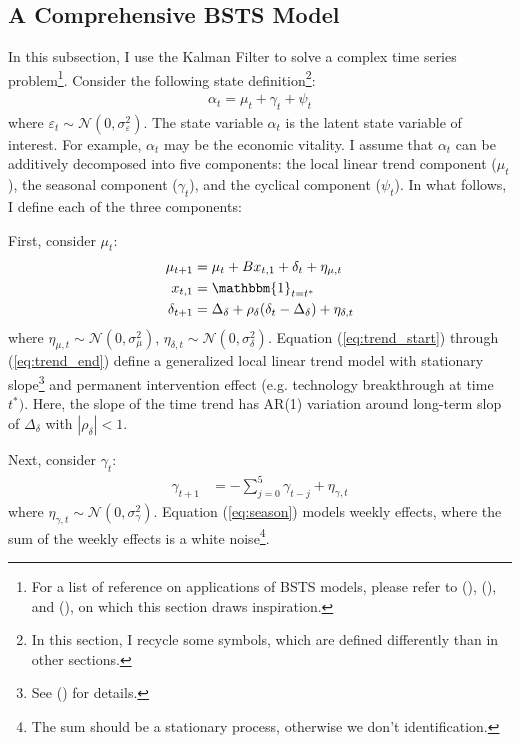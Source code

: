\documentclass[10pt, titlepage]{article}
\numberwithin{equation}{section}
\begin{document}
\subsection{A Comprehensive BSTS Model}
In this subsection, I use the Kalman Filter to solve a complex time series problem\footnote{For a list of reference on applications of BSTS models, please refer to (\cite{brodersen_etal_2015}), (\cite{harvey_1985}), and (\cite{harvey2007trends}), on which this section draws inspiration.}. Consider the following state definition\footnote{In this section, I recycle some symbols, which are defined differently than in other sections.}:
\begin{align}
    \alpha_t = \mu_t + \gamma_t + \psi_t \label{eq:state_decompose}
\end{align}
where $\varepsilon_t\sim\mathcal{N}(0,\sigma_{\varepsilon}^2)$. The state variable $\alpha_t$ is the latent state variable of interest. For example, $\alpha_t$ may be the economic vitality. I assume that $\alpha_t$ can be additively decomposed into five components: the local linear trend component ($\mu_t$), the seasonal component ($\gamma_t$), and the cyclical component ($\psi_t$). In what follows, I define each of the three components:

First, consider $\mu_t$:
\begin{align}
    \mu_{t+1} &= \mu_t+Bx_{t,1}+\delta_t+\eta_{\mu,t} \label{eq:trend_start} \\
    x_{t,1} &= \mathbbm{1}_{t=t^{*}} \\
    \delta_{t+1} &= \Delta_{\delta} + \rho_{\delta}(\delta_t-\Delta_{\delta}) + \eta_{\delta,t} \label{eq:trend_end} 
\end{align}
where $\eta_{\mu,t}\sim\mathcal{N}(0,\sigma_{\mu}^2)$, $\eta_{\delta,t}\sim\mathcal{N}(0,\sigma_{\delta}^2)$. Equation (\ref{eq:trend_start}) through (\ref{eq:trend_end}) define a generalized local linear trend model with stationary slope\footnote{See (\cite{brodersen_etal_2015}) for details.} and permanent intervention effect (e.g. technology breakthrough at time $t^*)$. Here, the slope of the time trend has AR(1) variation around long-term slop of $\Delta_{\delta}$ with $|\rho_{\delta}|<1$. 

Next, consider $\gamma_t$:
\begin{align}
    \gamma_{t+1}&= -\sum_{j=0}^{5}\gamma_{t-j} + \eta_{\gamma,t} \label{eq:season}
\end{align}
where $\eta_{\gamma,t}\sim\mathcal{N}(0,\sigma_{\gamma}^2)$. Equation (\ref{eq:season}) models weekly effects, where the sum of the weekly effects is a white noise\footnote{The sum should be a stationary process, otherwise we don't identification.}.
\end{document}

